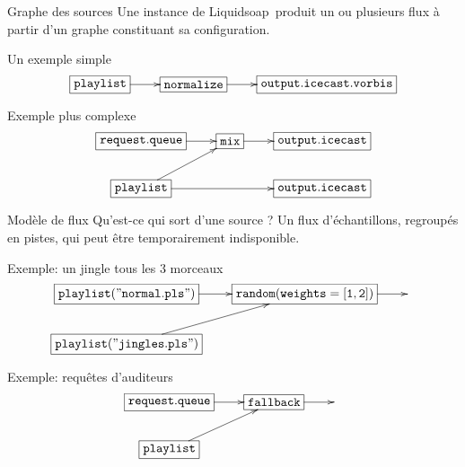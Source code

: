 \documentclass{beamer}
\renewcommand{\emph}[1]{\alert{#1}}
\newcommand{\liquidsoap}{Liquidsoap}
\begin{document}

\begin{ssl}{Graphe des sources}
Une instance de \liquidsoap\ produit un ou plusieurs flux à partir d'un graphe 
constituant sa configuration.

\begin{block}{Un exemple simple}
\[
\xymatrix{
  *+[F]{\mathtt{playlist}}\ar[r]&
  *+[F]{\mathtt{normalize}}\ar[r]&
  *+[F]{\mathtt{output.icecast.vorbis}}\\
}
\]
\end{block}

\begin{block}{Exemple plus complexe}
\[
\xymatrix{
  *+[F]{\mathtt{request.queue}}\ar[r]& *+[F]{\mathtt{mix}}\ar[r]&
    *+[F]{\mathtt{output.icecast}} \\
  *+[F]{\mathtt{playlist}}\ar[ur]\ar[rr] & &
  *+[F]{\mathtt{output.icecast}} \\
}
\]
\end{block}
\end{ssl}

\begin{ssl}{Modèle de flux}
  Qu'est-ce qui sort d'une source ?
  Un flux d'échantillons, regroupés en \emph{pistes},
  qui peut être temporairement \emph{indisponible}.

\begin{block}{Exemple: un \emph{jingle} tous les $3$ morceaux}
\[
\xymatrix{
  *+[F]{\mathtt{playlist("normal.pls")}}\ar[r] &
     *+[F]{\mathtt{random(weights=[1,2])}} \ar[r] & \\
  *+[F]{\mathtt{playlist("jingles.pls")}}\ar[ur] & & \\
}
\]
\end{block}

\begin{block}{Exemple: requêtes d'auditeurs}
\[
\xymatrix{
  *+[F]{\mathtt{request.queue}}\ar[r] &
     *+[F]{\mathtt{fallback}} \ar[r] & \\
  *+[F]{\mathtt{playlist}}\ar[ur] & & \\
}
\]
\end{block}
\end{ssl}
\end{document}
